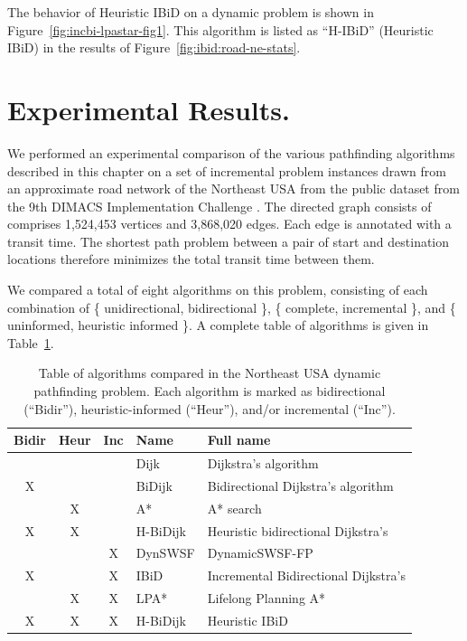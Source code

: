 The behavior of Heuristic IBiD on a dynamic problem is shown
in Figure~\ref{fig:incbi-lpastar-fig1}.
This algorithm is listed as ``H-IBiD'' (Heuristic IBiD)
in the results of Figure~\ref{fig:ibid:road-ne-stats}.

\section{Experimental Results.}
\label{sec:ibid:experiments}

We performed an experimental comparison of the various pathfinding
algorithms described in this chapter
on a set of incremental problem instances drawn from
an approximate road network of the Northeast USA
from the public dataset from the 9th DIMACS
Implementation Challenge \citep{demetrescuetal2006dimacs9}.
The directed graph consists of comprises 1,524,453 vertices
and 3,868,020 edges.
Each edge is annotated with a transit time.
The shortest path problem between a pair of start and destination
locations therefore minimizes the total transit time between them.

We compared a total of eight algorithms on this problem,
consisting of each combination of
\{ unidirectional, bidirectional \},
\{ complete, incremental \},
and
\{ uninformed, heuristic informed \}.
A complete table of algorithms is given
in Table~\ref{table:ibid:experiments-algorithms}.

\begin{table}
   \centering
   \begin{tabular}{cccll}
      \toprule
      Bidir & Heur & Inc & Name & Full name \\
      \midrule
        &   &   & Dijk & Dijkstra's algorithm \\
      X &   &   & BiDijk & Bidirectional Dijkstra's algorithm \\
        & X &   & A* & A* search \\
      X & X &   & H-BiDijk & Heuristic bidirectional Dijkstra's \\
        &   & X & DynSWSF & DynamicSWSF-FP \\
      X &   & X & IBiD & Incremental Bidirectional Dijkstra's \\
        & X & X & LPA* & Lifelong Planning A* \\
      X & X & X & H-BiDijk & Heuristic IBiD \\
      \bottomrule
   \end{tabular}
   \caption{Table of algorithms compared in the Northeast USA
      dynamic pathfinding problem.
      Each algorithm is marked as bidirectional (``Bidir''),
      heuristic-informed (``Heur''),
      and/or incremental (``Inc'').}
   \label{table:ibid:experiments-algorithms}
\end{table}

